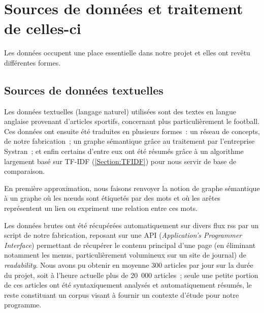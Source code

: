 \documentclass[a4paper, 12pt]{article}
\newcommand{\ang}[1]{\textit{#1}}%
\begin{document}


\section{Sources de données et traitement de celles-ci}\label{Section:sources}

Les données occupent une place essentielle dans notre projet et elles ont revêtu différentes formes.

\subsection{Sources de données textuelles}

Les données textuelles (langage naturel) utilisées sont des textes en langue anglaise provenant d'articles sportifs, concernant plus particulièrement le football. Ces données ont ensuite été traduites en plusieurs formes~: un réseau de concepts, de notre fabrication~; un graphe sémantique grâce au traitement par l'entreprise Systran~; et enfin certains d'entre eux ont été résumés grâce à un algorithme largement basé sur TF-IDF (\ref{Section:TFIDF}) pour nous servir de base de comparaison.


\begin{definition}
En première approximation, nous faisons renvoyer la notion de graphe sémantique à un graphe où les nœuds sont étiquetés par des mots et où les arêtes représentent un lien ou expriment une relation entre ces mots.
\end{definition}

Les données brutes ont été récupérées automatiquement sur divers flux rss par un script de notre fabrication, reposant sur une API (\ang{Application's Programmer Interface}) permettant de récupérer le contenu principal d'une page (en éliminant notamment les menus, particulièrement volumineux sur un site de journal) de \ang{readability}. Nous avons pu obtenir en moyenne 300 articles par jour sur la durée du projet, soit à l'heure actuelle plus de 20~000 articles~; seule une petite portion de ces articles ont été syntaxiquement analysés et automatiquement résumés, le reste constituant un corpus visant à fournir un contexte d'étude pour notre programme.
\end{document}
